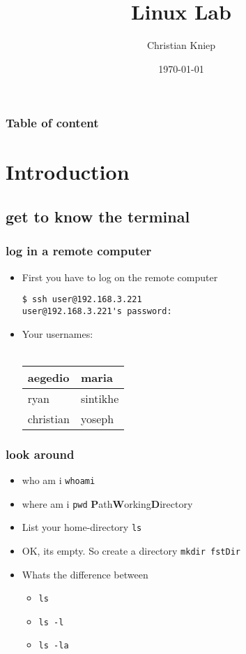 \documentclass[handout]{beamer}
\author{Christian Kniep}
\newcommand{\code}[1]{\colorbox{lGray}{\texttt{#1}}}
\begin{document}
\title[TITLE]{Linux Lab}  
\date[\today]{\today} 

\begin{frame}
	\titlepage
\end{frame} 

\begin{frame}
	\frametitle{Table of content}
	\tableofcontents
\end{frame} 


\section{Introduction} 
	\subsection{get to know the terminal}
		\begin{frame}[fragile]
			\frametitle{log in a remote computer}
			\begin{itemize}
				\item<1-> First you have to log on the remote computer \\
                        \begin{verbatim}
$ ssh user@192.168.3.221
user@192.168.3.221's password: 
\end{verbatim}
                \item<2-> Your usernames: \\ \ \\
                \begin{tabular}{|l|l|} \hline
                aegedio & maria \\ \hline
                ryan & sintikhe \\ \hline
                christian & yoseph \\ \hline
                \end{tabular}
            \end{itemize}
		\end{frame}
        \begin{frame}
			\frametitle{look around}
			\begin{itemize}
                \item<1-> who am i \code{whoami}
                \item<2-> where am i \code{pwd} \textbf{P}ath\textbf{W}orking\textbf{D}irectory
				\item<3-> List your home-directory \code{ls}
                \item<4-> OK, its empty. So create a directory \code{mkdir fstDir}
                \item<5-> Whats the difference between
                \begin{itemize}
                    \item<5-> \code{ls}
                    \item<5-> \code{ls -l}
                    \item<5-> \code{ls -la}                    
                \end{itemize}
            \end{itemize}
		\end{frame}
\end{document}
